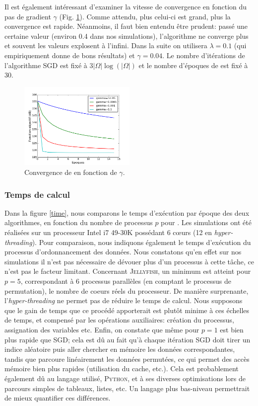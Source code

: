 \documentclass[10pt,a4paper]{article}
\begin{document}
Il est également intéressant d'examiner la vitesse de convergence en fonction du pas de gradient $\gamma$ (Fig. \ref{obj_gamma}). Comme attendu, plus celui-ci est grand, plus la convergence est rapide. Néanmoins, il faut bien entendu être prudent: passé une certaine valeur (environ 0.4 dans nos simulations), l'algorithme ne converge plus et souvent les valeurs explosent à l'infini. Dans la suite on utilisera $\lambda=0.1$ (qui empiriquement donne de bons résultats) et $\gamma=0.04$. Le nombre d'itérations de l'algorithme SGD est fixé à $3|\Omega|\log(|\Omega|)$ et le nombre d'époques de \jel est fixé à 30.

\begin{figure}[h]
\centering
\includegraphics[width=0.5\textwidth]{fig/obj_gamma}
\caption{Convergence de \jel en fonction de $\gamma$.}
\label{obj_gamma}
\end{figure}

\subsubsection*{Temps de calcul}
Dans la figure \ref{time}, nous comparons le temps d'exécution par époque des deux algorithmes, en fonction du nombre de processus $p$ pour \jel. Les simulations ont été réalisées sur un processeur Intel i7 49-30K possédant 6 cœurs (12 en \emph{hyper-threading}). Pour comparaison, nous indiquons également le temps d'exécution du processus d'ordonnancement des données. Nous constatons qu'en effet sur nos simulations il n'est pas nécessaire de dévouer plus d'un processus à cette tâche, ce n'est pas le facteur limitant. Concernant \textsc{Jellyfish}, un minimum est atteint pour $p=5$, correspondant à $6$ processus parallèles (en comptant le processus de permutation), le nombre de coeurs réels du processeur. De manière surprenante, l'\emph{hyper-threading} ne permet pas de réduire le temps de calcul. Nous supposons que le gain de temps que ce procédé apporterait est plutôt minime à ces échelles de temps, et compensé par les opérations auxiliaires: création du processus, assignation des variables etc. Enfin, on constate que même pour $p=1$ \jel est bien plus rapide que SGD; cela est dû au fait qu'à chaque itération SGD doit tirer un indice aléatoire puis aller chercher en mémoire les données correspondantes, tandis que \jel parcoure linéairement les données permutées, ce qui permet des accès mémoire bien plus rapides (utilisation du cache, etc.). Cela est probablement également dû au langage utilisé, \textsc{Python}, et à ses diverses optimisations lors de parcours simples de tableaux, listes, etc. Un langage plus bas-niveau permettrait de mieux quantifier ces différences.
\end{document}
